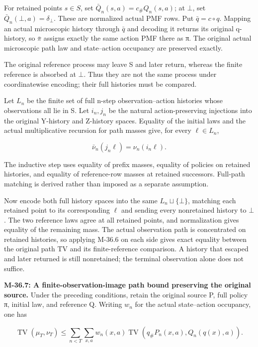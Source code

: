 \documentclass[
  english,
  11pt,
  oneside]{book}
\begin{document}
For retained points \(s\in S\), set \(\bar Q_n(s,a)=c_\#Q_n(s,a)\); at \(\bot\), set \(\bar Q_n(\bot,a)=\delta_\bot\). These are normalized actual PMF rows. Put \(\bar q=c\circ q\). Mapping an actual microscopic history through \(\bar q\) and decoding it returns its original q-history, so \(\bar\pi\) assigns exactly the same action PMF there as π. The original actual microscopic path law and state--action occupancy are preserved exactly.

The original reference process may leave S and later return, whereas the finite reference is absorbed at \(\bot\). Thus they are not the same process under coordinatewise encoding; their full histories must be compared.

Let \(L_n\) be the finite set of full n-step observation--action histories whose observations all lie in S. Let \(i_n,j_n\) be the natural action-preserving injections into the original Y-history and Z-history spaces. Equality of the initial laws and the actual multiplicative recursion for path masses give, for every \(\ell\in L_n\),

\[\bar\nu_n(j_n\ell)=\nu_n(i_n\ell).\]

The inductive step uses equality of prefix masses, equality of policies on retained histories, and equality of reference-row masses at retained successors. Full-path matching is derived rather than imposed as a separate assumption.

Now encode both full history spaces into the same \(L_n\sqcup\{\bot\}\), matching each retained point to its corresponding \(\ell\) and sending every nonretained history to \(\bot\). The two reference laws agree at all retained points, and normalization gives equality of the remaining mass. The actual observation path is concentrated on retained histories, so applying M-36.6 on each side gives exact equality between the original path TV and its finite-reference comparison. A history that escaped and later returned is still nonretained; the terminal observation alone does not suffice.

\hypertarget{m-36-7}{}\label{m-36-7}

\textbf{M-36.7: A finite-observation-image path bound preserving the original source.} Under the preceding conditions, retain the original source P, full policy π, initial law, and reference Q. Writing \(w_n\) for the actual state--action occupancy, one has

\[\operatorname{TV}(\mu_T,\nu_T)
\le \sum_{n<T}\sum_{x,a}w_n(x,a)
\operatorname{TV}(q_\#P_n(x,a),Q_n(q(x),a)).\]
\end{document}
